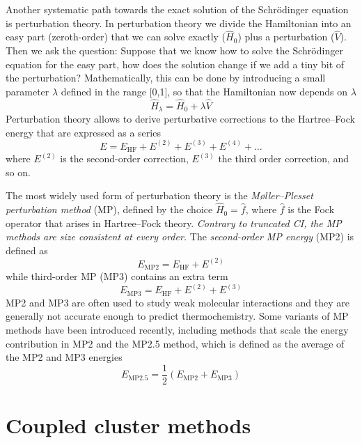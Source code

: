 \documentclass[../Main/chem371-notes.tex]{subfiles}
\begin{document}
Another systematic path towards the exact solution of the Schr\"{o}dinger equation is perturbation theory.
In perturbation theory we divide the Hamiltonian into an easy part (zeroth-order) that we can solve exactly ($\hat{H}_0$) plus a perturbation ($\hat{V}$).
Then we ask the question: Suppose that we know how to solve the Schr\"{o}dinger equation for the easy part, how does the solution change if we add a tiny bit of the perturbation?
Mathematically, this can be done by introducing a small parameter $\lambda$ defined in the range [0,1], so that the Hamiltonian now depends on $\lambda$
\begin{equation}
\hat{H}_\lambda = \hat{H}_0 + \lambda \hat{V}
\end{equation}
Perturbation theory allows to derive perturbative corrections to the Hartree--Fock energy that are expressed as a series
\begin{equation}
E = E_\text{HF} + E^{(2)} + E^{(3)} + E^{(4)} + \ldots
\end{equation}
where $E^{(2)}$ is the second-order correction, $E^{(3)}$ the third order correction, and so on.

The most widely used form of perturbation theory is the \emph{M{\o}ller--Plesset perturbation method} (MP), defined by the choice $\hat{H}_0 = \hat{f}$, where $\hat{f}$ is the Fock operator that arises in Hartree--Fock theory.
\emph{Contrary to truncated CI, the MP methods are size consistent at every order.}
The \emph{second-order MP energy} (MP2) is defined as
\begin{equation}
E_\text{MP2} = E_\text{HF} + E^{(2)}
\end{equation}
while third-order MP (MP3) contains an extra term
\begin{equation}
E_\text{MP3} = E_\text{HF} + E^{(2)} + E^{(3)}
\end{equation}
MP2 and MP3 are often used to study weak molecular interactions and they are generally not accurate enough to predict thermochemistry.
Some variants of MP methods have been introduced recently, including methods that scale the energy contribution in MP2 and the MP2.5 method, which is defined as the average of the MP2 and MP3 energies
\begin{equation}
E_\text{MP2.5} = \frac{1}{2} (E_\text{MP2} +E_\text{MP3})
\end{equation}


\section{Coupled cluster methods}
\end{document}
